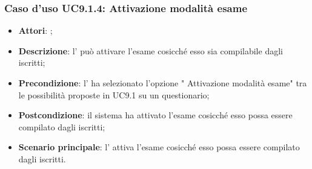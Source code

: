 		\subsubsection{Caso d'uso UC9.1.4: Attivazione modalità esame}
		\label{UC9.1.4}
		\begin{itemize}
			\item \textbf{Attori}: \uaupro{};
			\item \textbf{Descrizione}: l'\uaupro{} può attivare l'esame cosicché esso sia compilabile dagli \uau{} iscritti;
			\item \textbf{Precondizione}: l'\uaupro{} ha selezionato l'opzione " Attivazione modalità esame" tra le possibilità proposte in UC9.1 su un questionario;
			\item \textbf{Postcondizione}: il sistema ha attivato l'esame cosicché esso possa essere compilato dagli \uaus{} iscritti;
			\item \textbf{Scenario principale}: l'\uaupro{} attiva l'esame cosicché esso possa essere compilato dagli \uaus{} iscritti.
		\end{itemize}
										
